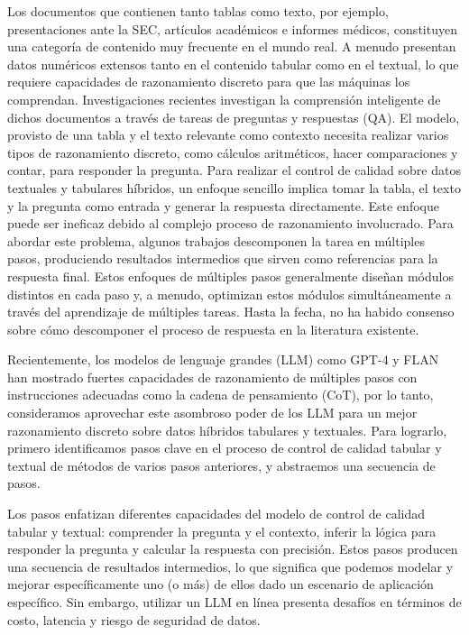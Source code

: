 \documentclass[12pt]{report} %
\begin{document}
Los documentos que contienen tanto tablas como texto, por ejemplo, presentaciones ante la SEC, artículos académicos e informes médicos, constituyen una categoría de contenido muy frecuente en el mundo real. A menudo presentan datos numéricos extensos tanto en el contenido tabular como en el textual, lo que requiere capacidades de razonamiento discreto para que las máquinas los comprendan. Investigaciones recientes investigan la comprensión inteligente de dichos documentos a través de tareas de preguntas y respuestas (QA). El modelo, provisto de una tabla y el texto relevante como contexto necesita realizar varios tipos de razonamiento discreto, como cálculos aritméticos, hacer comparaciones y contar, para responder la pregunta. Para realizar el control de calidad sobre datos textuales y tabulares híbridos, un enfoque sencillo implica tomar la tabla, el texto y la pregunta como entrada y generar la respuesta directamente. Este enfoque puede ser ineficaz debido al complejo proceso de razonamiento involucrado. Para abordar este problema, algunos trabajos descomponen la tarea en múltiples pasos, produciendo resultados intermedios que sirven como referencias para la respuesta final. Estos enfoques de múltiples pasos generalmente diseñan módulos distintos en cada paso y, a menudo, optimizan estos módulos simultáneamente a través del aprendizaje de múltiples tareas. Hasta la fecha, no ha habido consenso sobre cómo descomponer el proceso de respuesta en la literatura existente.\cite{5}\par
Recientemente, los modelos de lenguaje grandes (LLM) como GPT-4 y FLAN han mostrado fuertes capacidades de razonamiento de múltiples pasos con instrucciones adecuadas como la cadena de pensamiento (CoT), por lo tanto, consideramos aprovechar este asombroso poder de los LLM para un mejor razonamiento discreto sobre datos híbridos tabulares y textuales. Para lograrlo, primero identificamos pasos clave en el proceso de control de calidad tabular y textual de métodos de varios pasos anteriores, y abstraemos una secuencia de pasos.\cite{5}\par
Los pasos enfatizan diferentes capacidades del modelo de control de calidad tabular y textual: comprender la pregunta y el contexto, inferir la lógica para responder la pregunta y calcular la respuesta con precisión. Estos pasos producen una secuencia de resultados intermedios, lo que significa que podemos modelar y mejorar específicamente uno (o más) de ellos dado un escenario de aplicación específico. Sin embargo, utilizar un LLM en línea presenta desafíos en términos de costo, latencia y riesgo de seguridad de datos. \cite{5}\par
\end{document}

